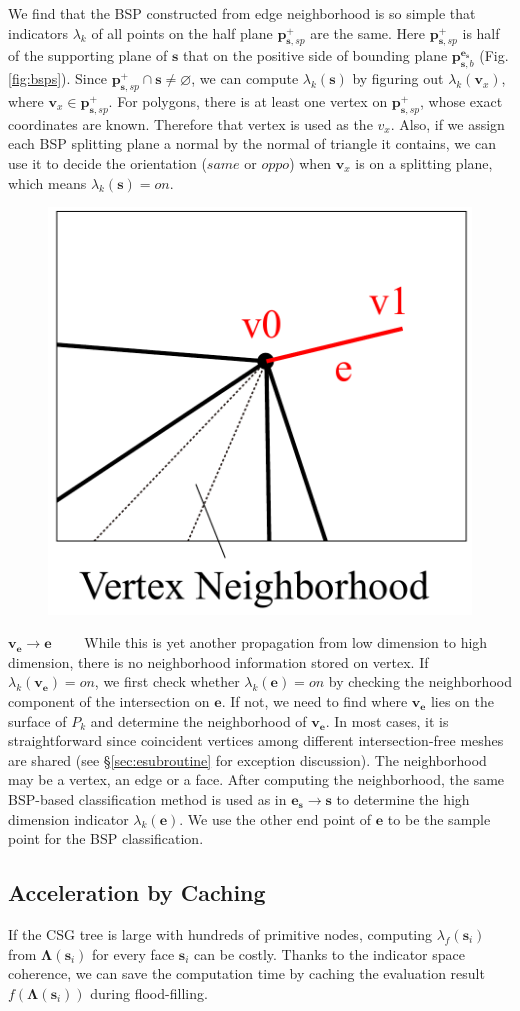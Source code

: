 \documentclass[10pt,journal,compsoc]{IEEEtran}
\begin{document}
We find that the BSP constructed from edge neighborhood is so simple that indicators $\lambda_k$ of all points on the half plane $\bm{p}_{\bm{s}, sp}^+$ are the same. Here $\bm{p}_{\bm{s}, sp}^+$ is half of the supporting plane of $\bm{s}$ that on the positive side of bounding plane $\bm{p}_{\bm{s}, b}^{\bm{e}_{\bm{s}}}$ (Fig. \ref{fig:bsps}). Since $\bm{p}_{\bm{s}, sp}^+ \cap \bm{s} \neq \varnothing$, we can compute $\lambda_k(\bm{s})$ by figuring out $\lambda_k(\bm{v}_x)$, where $\bm{v}_x \in \bm{p}_{\bm{s}, sp}^+$. For polygons, there is at least one vertex on $\bm{p}_{\bm{s}, sp}^+$, whose exact coordinates are known. Therefore that vertex is used as the $v_x$. Also, if we assign each BSP splitting plane a normal by the normal of triangle it contains, we can use it to decide the orientation ($same$ or $oppo$) when $\bm{v}_x$ is on a splitting plane, which means $\lambda_k(\bm{s})=on$.

\vspace{0.5em}
\begin{figure}
\includegraphics[width=1.3 in]{vneighbor}
\end{figure}
\noindent\textbf{$\bm{\bm{v}_{\bm{e}}\to e}$}~~~~ While this is yet another propagation from low dimension to high dimension, there is no neighborhood information stored on vertex. If $\lambda_k(\bm{v}_{\bm{e}})=on$, we first check whether $\lambda_k(\bm{e}) = on$ by checking the neighborhood component of the intersection on $\bm{e}$. If not, we need to find where $\bm{v}_{\bm{e}}$ lies on the surface of $P_k$ and determine the neighborhood of $\bm{v}_{\bm{e}}$. In most cases, it is straightforward since coincident vertices among different intersection-free meshes are shared (see \S\ref{sec:esubroutine} for exception discussion). The neighborhood may be a vertex, an edge or a face. After computing the neighborhood, the same BSP-based classification method is used as in ${\bm{e}_{\bm{s}}\to \bm{s}}$ to determine the high dimension indicator $\lambda_k(\bm{e})$. We use the other end point of $\bm{e}$ to be the sample point for the BSP classification.


\subsection{Acceleration by Caching}
\label{sec:acc}
If the CSG tree is large with hundreds of primitive nodes, computing $\lambda_f(\bm{s}_i)$ from $\boldsymbol{\Lambda}(\bm{s}_i)$ for every face $\bm{s}_i$ can be costly. Thanks to the indicator space coherence, we can save the computation time by caching the evaluation result $f(\boldsymbol{\Lambda}(\bm{s}_i))$ during flood-filling.
\end{document}
